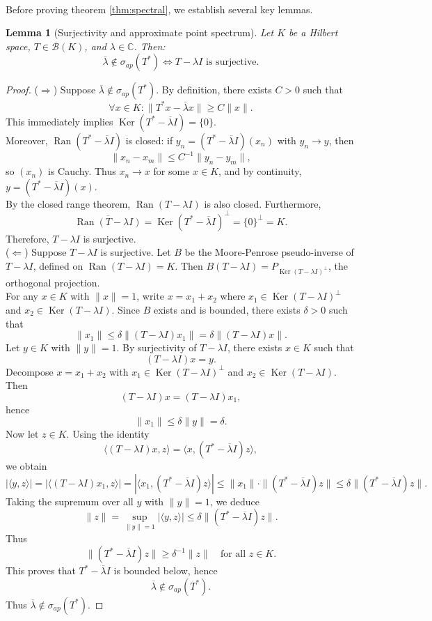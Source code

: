 \documentclass[a4paper,11pt]{article}
\theoremstyle{plain}
\newtheorem{lemma}[theorem]{Lemma}
\theoremstyle{definition}
\theoremstyle{remark}
\DeclareMathOperator{\Ker}{Ker}
\DeclareMathOperator{\Ran}{Ran}
\begin{document}
\mbox{} \\
Before proving theorem \ref{thm:spectral}, we establish several key lemmas.

\begin{lemma}[Surjectivity and approximate point spectrum]
\label{Lemma(T-L)SurjApproxSpecAdjoint}
Let $K$ be a Hilbert space, $T \in \mathcal{B}(K)$, and $\lambda \in \mathbb{C}$. Then:
\[\overline{\lambda} \notin \sigma_{ap}(T^*) \Leftrightarrow T - \lambda I \text{ is surjective}.\]
\end{lemma}

\begin{proof}
($\Rightarrow$) Suppose $\overline{\lambda} \notin \sigma_{ap}(T^*)$. By definition, there exists $C > 0$ such that
\[\forall x \in K : \|T^*x - \overline{\lambda}x\| \geq C\|x\|.\]
This immediately implies $\Ker(T^* - \overline{\lambda}I) = \{0\}$. \\
Moreover, $\Ran(T^* - \overline{\lambda}I)$ is closed: if $y_n = (T^* - \overline{\lambda}I)(x_n)$ with $y_n \to y$, then
\[\|x_n - x_m\| \leq C^{-1}\|y_n - y_m\|,\]
so $(x_n)$ is Cauchy. Thus $x_n \to x$ for some $x \in K$, and by continuity, $y = (T^* - \overline{\lambda}I)(x)$. \\
By the closed range theorem, $\Ran(T - \lambda I)$ is also closed. Furthermore,
\[\overline{\Ran(T - \lambda I)} = \Ker(T^* - \overline{\lambda}I)^{\perp} = \{0\}^{\perp} = K.\]
Therefore, $T - \lambda I$ is surjective. \\
($\Leftarrow$) Suppose $T - \lambda I$ is surjective. Let $B$ be the Moore-Penrose pseudo-inverse of $T - \lambda I$, defined on $\Ran(T - \lambda I) = K$. Then $B(T - \lambda I) = P_{\Ker(T-\lambda I)^{\perp}}$, the orthogonal projection. \\
For any $x \in K$ with $\|x\| = 1$, write $x = x_1 + x_2$ where $x_1 \in \Ker(T - \lambda I)^{\perp}$ and $x_2 \in \Ker(T - \lambda I)$. Since $B$ exists and is bounded, there exists $\delta > 0$ such that
\[\|x_1\| \leq \delta\|(T - \lambda I)x_1\| = \delta\|(T - \lambda I)x\|.\]
Let $y \in K$ with $\|y\|=1$. By surjectivity of $T-\lambda I$, there exists $x \in K$ such that
\[
(T-\lambda I)x = y.
\]
Decompose $x = x_1 + x_2$ with $x_1 \in \Ker(T-\lambda I)^\perp$ and $x_2 \in \Ker(T-\lambda I)$. Then
\[
(T-\lambda I)x = (T-\lambda I)x_1,
\]
hence
\[
\|x_1\| \le \delta \|y\| = \delta.
\]
Now let $z \in K$. Using the identity
\[
\langle (T-\lambda I)x, z \rangle = \langle x, (T^*-\overline{\lambda}I)z \rangle,
\]
we obtain
\[
|\langle y, z \rangle|
= |\langle (T-\lambda I)x_1, z \rangle|
= |\langle x_1, (T^*-\overline{\lambda}I)z \rangle|
\le \|x_1\| \cdot \|(T^*-\overline{\lambda}I)z\|
\le \delta \|(T^*-\overline{\lambda}I)z\|.
\]
Taking the supremum over all $y$ with $\|y\|=1$, we deduce
\[
\|z\|
= \sup_{\|y\|=1} |\langle y,z\rangle|
\le \delta \|(T^*-\overline{\lambda}I)z\|.
\]
Thus
\[
\|(T^*-\overline{\lambda}I)z\| \ge \delta^{-1}\|z\|
\quad \text{for all } z \in K.
\]
This proves that $T^*-\overline{\lambda}I$ is bounded below, hence
\[
\overline{\lambda} \notin \sigma_{ap}(T^*).
\]
Thus $\overline{\lambda} \notin \sigma_{ap}(T^*)$. 
\end{proof}
\end{document}
